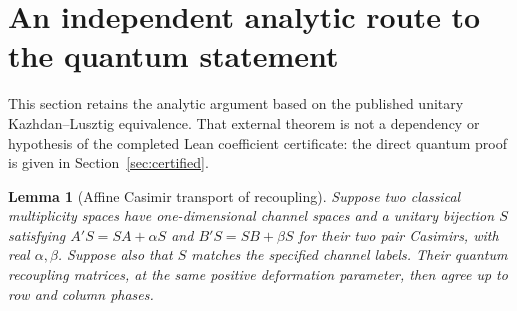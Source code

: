 \documentclass[10pt,a4paper]{article}
\newtheorem{lemma}[theorem]{Lemma}
\newenvironment{revision}{\begingroup}{\endgroup}
\begin{document}
\section{An independent analytic route to the quantum statement}\label{sec:KZroute}
\begin{revision}
This section retains the analytic argument based on the published unitary
Kazhdan--Lusztig equivalence. That external theorem is not a dependency or
hypothesis of the completed Lean coefficient certificate: the direct
quantum proof is given in Section~\ref{sec:certified}.
\end{revision}
\begin{lemma}[Affine Casimir transport of recoupling]\label{lem:KZ}
Suppose two classical multiplicity spaces have one-dimensional channel
spaces and a unitary bijection $S$ satisfying
$A'S=S A+\alpha S$ and $B'S=S B+\beta S$ for their two pair Casimirs,
with real $\alpha,\beta$. Suppose also that $S$ matches the specified
channel labels. Their quantum recoupling matrices, at the same positive
deformation parameter, then agree up to row and column phases.
\end{lemma}
\end{document}
